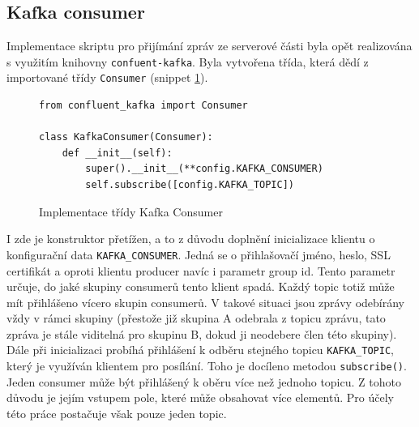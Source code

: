 \documentclass[thesis=M,czech,hidelinks]{FITthesis}[2013/05/06]
\begin{document}
\subsection{Kafka consumer} \label{sec:kafkaconsumer}
Implementace skriptu pro přijímání zpráv ze serverové části byla opět realizována s využitím knihovny \texttt{confuent-kafka}. Byla vytvořena třída, která dědí z importované třídy \texttt{Consumer} (snippet \ref{snip:kafkaconsumer}).
\begin{figure}[h]               
	\begin{verbatim}
from confluent_kafka import Consumer

class KafkaConsumer(Consumer):
    def __init__(self):
        super().__init__(**config.KAFKA_CONSUMER)
        self.subscribe([config.KAFKA_TOPIC])
	\end{verbatim}      
	\caption{Implementace třídy Kafka Consumer}
	\label{snip:kafkaconsumer}
\end{figure}
I zde je konstruktor přetížen, a to z důvodu doplnění inicializace klientu o konfigurační data \texttt{KAFKA_CONSUMER}. Jedná se o přihlašovačí jméno, heslo, SSL certifikát a oproti klientu producer navíc i parametr group id. Tento parametr určuje, do jaké skupiny consumerů tento klient spadá. Každý topic totiž může mít přihlášeno vícero skupin consumerů. V takové situaci jsou zprávy odebírány vždy v rámci skupiny (přestože již skupina A odebrala z topicu zprávu, tato zpráva je stále viditelná pro skupinu B, dokud ji neodebere člen této skupiny). Dále při inicializaci probíhá přihlášení k odběru stejného topicu \texttt{KAFKA_TOPIC}, který je využíván klientem pro posílání. Toho je docíleno metodou \texttt{subscribe()}. Jeden consumer může být přihlášený k oběru více než jednoho topicu. Z tohoto důvodu je jejím vstupem pole, které může obsahovat více elementů. Pro účely této práce postačuje však pouze jeden topic.
\end{document}
